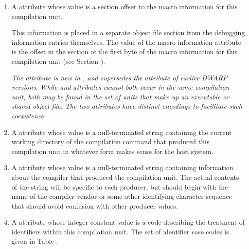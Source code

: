 \begin{enumerate}[1. ]
\item A \DWATmacrosDEFN{}\hypertarget{chap:DWATmacrosmacroinformation}{}
attribute 
whose value is a 
section offset to the macro information for this compilation unit.

This information is placed in a separate object file section
from the debugging information entries themselves. The
value of the macro information attribute is the offset in
the \dotdebugmacro{} section of the first byte of the macro
information for this compilation unit 
(see Section ).

\textit{The \DWATmacrosNAME{} attribute is new in \DWARFVersionV, 
and supersedes the 
\DWATmacroinfoDEFN{} attribute of earlier DWARF versions.
While \DWATmacrosNAME{} and \DWATmacroinfoNAME{} attributes cannot both occur in the same
compilation unit, both may be found in the set of units that make up an executable
or shared object file. The two attributes have distinct encodings to facilitate such
coexistence.}

\item  A 
\DWATcompdirDEFN{} attribute 
\hypertarget{chap:DWATcompdircompilationdirectory}{}
whose value is a
null-terminated string containing the current working directory
of the compilation command that produced this compilation
unit in whatever form makes sense for the host system.

\item  A \DWATproducerDEFN{} attribute 
whose value is a null-terminated string containing 
information about the compiler
\hypertarget{chap:DWATproducercompileridentification}{}
that produced the compilation unit. The actual contents of
the string will be specific to each producer, but should
begin with the name of the compiler vendor or some other
identifying character sequence that should avoid confusion
with other producer values.

\item  A \DWATidentifiercaseDEFN{} 
attribute 
whose integer
\hypertarget{chap:DWATidentifiercaseidentifiercaserule}{}
constant value is a code describing the treatment
of identifiers within this compilation unit. The
set of identifier case codes is given in
Table .


\end{enumerate}
